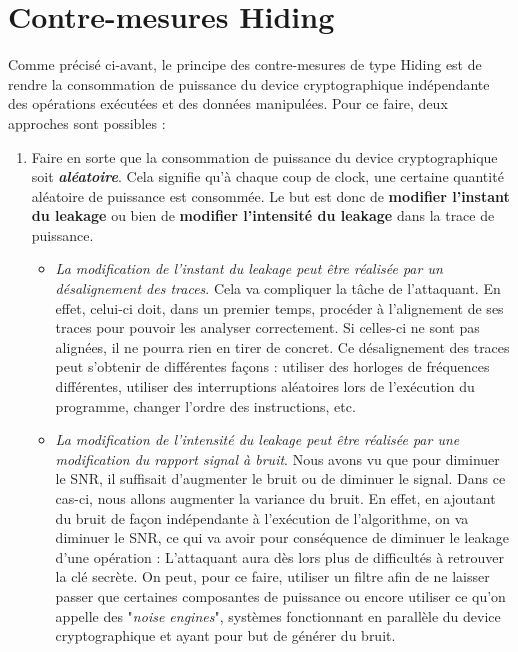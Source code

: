\documentclass[oneside]{book}
\begin{document}
\newpage

\section{Contre-mesures Hiding}
\label{sec:hiding}

\vspace{-0.1 cm}Comme précisé ci-avant, le principe des contre-mesures de type Hiding \cite{fernando} est de rendre la consommation de puissance du device cryptographique indépendante des opérations exécutées et des données manipulées. Pour ce faire, deux approches sont possibles :
\begin{enumerate}
\item Faire en sorte que la consommation de puissance du device cryptographique soit \textbf{\textit{aléatoire}}. Cela signifie qu'à chaque coup de clock, une certaine quantité aléatoire de puissance est consommée. Le but est donc de \textbf{modifier l'instant du leakage} ou bien de \textbf{modifier l'intensité du leakage} dans la trace de puissance.
\begin{itemize}
\item \textit{La modification de l'instant du leakage peut être réalisée par un désalignement des traces}. Cela va compliquer la tâche de l'attaquant. En effet, celui-ci doit, dans un premier temps, procéder à l'alignement de ses traces pour pouvoir les analyser correctement. Si celles-ci ne sont pas alignées, il ne pourra rien en tirer de concret. Ce désalignement des traces peut s’obtenir de différentes façons : utiliser des horloges de fréquences différentes, utiliser des interruptions aléatoires lors de l’exécution du programme, changer l’ordre des instructions, etc.
\item \textit{La modification de l'intensité du leakage peut être réalisée par une modification du rapport signal à bruit}. Nous avons vu que pour diminuer le SNR, il suffisait d'augmenter le bruit ou de diminuer le signal. Dans ce cas-ci, nous allons augmenter la variance du bruit. En effet, en ajoutant du bruit de façon indépendante à l'exécution de l'algorithme, on va diminuer le SNR, ce qui va avoir pour conséquence de diminuer le leakage d'une opération : L'attaquant aura dès lors plus de difficultés à retrouver la clé secrète. On peut, pour ce faire, utiliser un filtre afin de ne laisser passer que certaines composantes de puissance ou encore utiliser ce qu'on appelle des "\textit{noise engines}", systèmes fonctionnant en parallèle du device cryptographique et ayant pour but de générer du bruit.

\end{itemize}
\end{enumerate}
\end{document}
